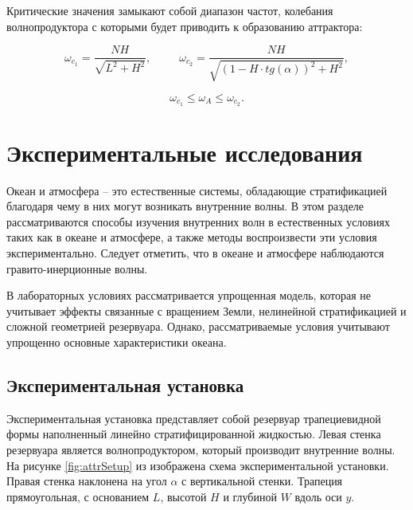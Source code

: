 Критические значения замыкают собой диапазон частот, колебания волнопродуктора с которыми будет приводить к образованию аттрактора:

\begin{equation}
    \omega_{c_{1}}=\frac{NH}{\sqrt{L^2+H^2}}, \;\;\;\;\;\;\;\;\; \omega_{c_{2}} = \frac{NH}{\sqrt{\left( 1-H\cdot tg(\alpha) \right)^2+H^2}},
\end{equation}


\begin{equation}
    \omega_{c_{1}} \leq \omega_A \leq \omega_{c_{2}}.
\end{equation}


\section{Экспериментальные исследования}

Океан и атмосфера -- это естественные системы, обладающие стратификацией благодаря чему в них могут возникать внутренние волны. В этом разделе рассматриваются способы изучения внутренних волн в естественных условиях таких как в океане и атмосфере, а также методы воспроизвести эти условия экспериментально. Следует отметить, что в океане и атмосфере наблюдаются гравито-инерционные волны.

В лабораторных условиях рассматривается упрощенная модель, которая не учитывает эффекты связанные с вращением Земли, нелинейной стратификацией и сложной геометрией резервуара. Однако, рассматриваемые условия учитывают упрощенно основные характеристики океана. 

\subsection{Экспериментальная установка}

Экспериментальная установка представляет собой резервуар трапециевидной формы наполненный линейно стратифицированной жидкостью. Левая стенка резервуара является волнопродуктором, который производит внутренние волны. На рисунке \ref{fig:attrSetup} из \cite{Brouzet2016} изображена схема экспериментальной установки. Правая стенка наклонена на угол $\alpha$ с вертикальной стенки. Трапеция прямоугольная, с основанием $L$, высотой $H$ и глубиной $W$ вдоль оси $y$. 

